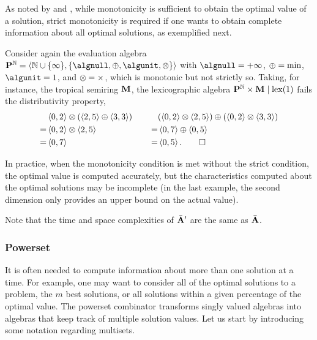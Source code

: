 As noted by \textcite{Morin1982MonotonicityPrincipleOptimality} and \textcite{Steffen2005VersatileDeclarativeDynamic}, while monotonicity is sufficient to obtain the optimal value of a solution, strict monotonicity is required if one wants to obtain complete information about all optimal solutions, as exemplified next.
\begin{example}
    Consider again the evaluation algebra \(\alprod^{\nat} = \tup{\natex, \{\algnull, \algplus, \algunit, \algtimes\}}\)
    with \(\algnull = +\infty\), \(\mathbin{\oplus} = \min\), \(\algunit = 1\), and \(\mathbin{\otimes} = \times\),
    which is monotonic but not strictly so.
    Taking, for instance, the tropical semiring \(\mathbf{M}\),
    the lexicographic algebra \(\mathbf{P}^{\mathbb{N}} \times \mathbf{M} \mid \mathrm{lex}(1)\) fails the distributivity property,
    \begin{align*}
        &\left\langle0, 2\right\rangle \mathbin{\otimes} (\left\langle2, 5\right\rangle \mathbin{\oplus} \left\langle3, 3\right\rangle)
            &\hspace{2em}
            &(\left\langle0, 2\right\rangle \mathbin{\otimes} \left\langle2, 5\right\rangle) \mathbin{\oplus} (\left\langle0, 2\right\rangle \mathbin{\otimes} \left\langle3, 3\right\rangle)
            \\
        = &\left\langle0, 2\right\rangle \mathbin{\otimes} \left\langle2, 5\right\rangle
            &= &\left\langle0, 7\right\rangle \mathbin{\oplus} \left\langle0, 5\right\rangle
            \\
        = &\left\langle0, 7\right\rangle
            &= &\left\langle0, 5\right\rangle. \qedhere
    \end{align*}
\end{example}

In practice, when the monotonicity condition is met without the strict condition, the optimal value is computed accurately, but the characteristics computed about the optimal solutions may be incomplete (in the last example, the second dimension only provides an upper bound on the actual value).

Note that the time and space complexities of \(\bar{\mathbf{A}}'\) are the same as \(\bar{\mathbf{A}}\).

\subsubsection{Powerset}

It is often needed to compute information about more than one solution at a time.
For example, one may want to consider all of the optimal solutions to a problem, the \(m\) best solutions, or all solutions within a given percentage of the optimal value.
The powerset combinator transforms singly valued algebras into algebras that keep track of multiple solution values.
Let us start by introducing some notation regarding multisets.

